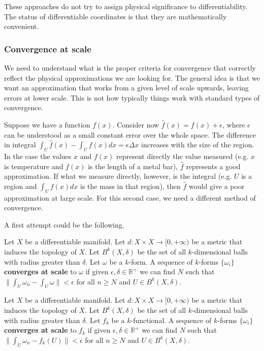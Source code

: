 \documentclass[10pt, onecolumn, longbibliography, nofootinbib]{revtex4-2}
\begin{document}
These approaches do not try to assign physical significance to differentiability. The status of differentiable coordinates is that they are mathematically convenient.

\subsubsection{Convergence at scale}

We need to understand what is the proper criteria for convergence that correctly reflect the physical approximations we are looking for. The general idea is that we want an approximation that works from a given level of scale upwards, leaving errors at lower scale. This is not how typically things work with standard types of convergence.

Suppose we have a function $f(x)$. Consider now $\hat{f}(x) = f(x) + \epsilon$, where $\epsilon$ can be understood as a small constant error over the whole space. The difference in integral $\int_U \hat{f}(x) - \int_U f(x)dx = \epsilon \Delta x$ increases with the size of the region. In the case the values $x$ and $f(x)$ represent directly the value measured (e.g. $x$ is temperature and $f(x)$ is the length of a metal bar), $\hat{f}$ represents a good approximation. If what we measure directly, however, is the integral (e.g. $U$ is a region and $\int_U f(x)dx$ is the mass in that region), then $\hat{f}$ would give a poor approximation at large scale. For this second case, we need a different method of convergence.

A first attempt could be the following.

\begin{defn}
	Let $X$ be a differentiable manifold. Let $d : X \times X \to [0, +\infty)$ be a metric that induces the topology of $X$. Let $B^k(X, \delta)$ be the set of all $k$-dimensional balls with radius greater than $\delta$. Let $\omega$ be a $k$-form. A sequence of $k$-forms $\{\omega_i\}$ \textbf{converges at scale} to $\omega$ if given $\epsilon, \delta \in \mathbb{R}^+$ we can find $N$ such that $\| \int_U \omega_n - \int_U \omega \| < \epsilon$ for all $n \geq N$ and $U \in B^k(X, \delta)$.
\end{defn}

\begin{defn}
	Let $X$ be a differentiable manifold. Let $d : X \times X \to [0, +\infty)$ be a metric that induces the topology of $X$. Let $B^k(X, \delta)$ be the set of all $k$-dimensional balls with radius greater than $\delta$. Let $f_k$ be a $k$-functional. A sequence of $k$-forms $\{\omega_i\}$ \textbf{converges at scale} to $f_k$ if given $\epsilon, \delta \in \mathbb{R}^+$ we can find $N$ such that $\| \int_U \omega_n - f_k(U) \| < \epsilon$ for all $n \geq N$ and $U \in B^k(X, \delta)$.
\end{defn}
\end{document}
